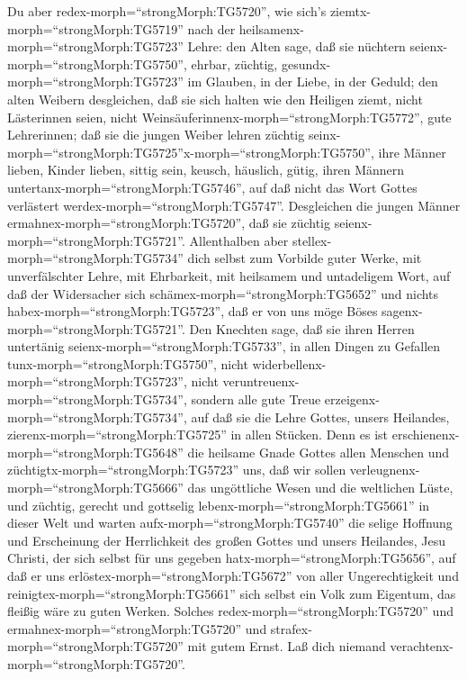  Du aber redex-morph=``strongMorph:TG5720'', wie sich's
ziemtx-morph=``strongMorph:TG5719'' nach der
heilsamenx-morph=``strongMorph:TG5723'' Lehre:  den Alten
sage, daß sie nüchtern seienx-morph=``strongMorph:TG5750'', ehrbar,
züchtig, gesundx-morph=``strongMorph:TG5723'' im Glauben, in der Liebe,
in der Geduld;  den alten Weibern desgleichen, daß sie sich
halten wie den Heiligen ziemt, nicht Lästerinnen seien, nicht
Weinsäuferinnenx-morph=``strongMorph:TG5772'', gute Lehrerinnen;
 daß sie die jungen Weiber lehren züchtig
seinx-morph=``strongMorph:TG5725''x-morph=``strongMorph:TG5750'', ihre
Männer lieben, Kinder lieben,  sittig sein, keusch,
häuslich, gütig, ihren Männern untertanx-morph=``strongMorph:TG5746'',
auf daß nicht das Wort Gottes verlästert
werdex-morph=``strongMorph:TG5747''.  Desgleichen die jungen
Männer ermahnex-morph=``strongMorph:TG5720'', daß sie züchtig
seienx-morph=``strongMorph:TG5721''.  Allenthalben aber
stellex-morph=``strongMorph:TG5734'' dich selbst zum Vorbilde guter
Werke, mit unverfälschter Lehre, mit Ehrbarkeit,  mit
heilsamem und untadeligem Wort, auf daß der Widersacher sich
schämex-morph=``strongMorph:TG5652'' und nichts
habex-morph=``strongMorph:TG5723'', daß er von uns möge Böses
sagenx-morph=``strongMorph:TG5721''.  Den Knechten sage, daß
sie ihren Herren untertänig seienx-morph=``strongMorph:TG5733'', in
allen Dingen zu Gefallen tunx-morph=``strongMorph:TG5750'', nicht
widerbellenx-morph=``strongMorph:TG5723'',  nicht
veruntreuenx-morph=``strongMorph:TG5734'', sondern alle gute Treue
erzeigenx-morph=``strongMorph:TG5734'', auf daß sie die Lehre Gottes,
unsers Heilandes, zierenx-morph=``strongMorph:TG5725'' in allen Stücken.
 Denn es ist erschienenx-morph=``strongMorph:TG5648'' die
heilsame Gnade Gottes allen Menschen  und
züchtigtx-morph=``strongMorph:TG5723'' uns, daß wir sollen
verleugnenx-morph=``strongMorph:TG5666'' das ungöttliche Wesen und die
weltlichen Lüste, und züchtig, gerecht und gottselig
lebenx-morph=``strongMorph:TG5661'' in dieser Welt  und
warten aufx-morph=``strongMorph:TG5740'' die selige Hoffnung und
Erscheinung der Herrlichkeit des großen Gottes und unsers Heilandes,
Jesu Christi,  der sich selbst für uns gegeben
hatx-morph=``strongMorph:TG5656'', auf daß er uns
erlöstex-morph=``strongMorph:TG5672'' von aller Ungerechtigkeit und
reinigtex-morph=``strongMorph:TG5661'' sich selbst ein Volk zum
Eigentum, das fleißig wäre zu guten Werken.  Solches
redex-morph=``strongMorph:TG5720'' und
ermahnex-morph=``strongMorph:TG5720'' und
strafex-morph=``strongMorph:TG5720'' mit gutem Ernst. Laß dich niemand
verachtenx-morph=``strongMorph:TG5720''.

